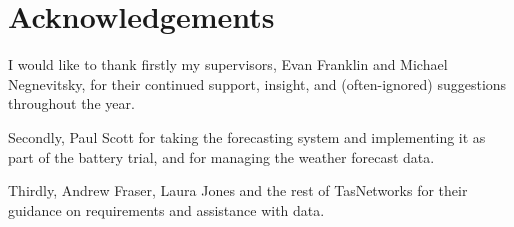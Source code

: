 \chapter{Acknowledgements}

I would like to thank firstly my supervisors, Evan Franklin and Michael Negnevitsky, for their continued support, insight, and (often-ignored) suggestions throughout the year.

Secondly, Paul Scott for taking the forecasting system and implementing it as part of the battery trial, and for managing the weather forecast data.

Thirdly, Andrew Fraser, Laura Jones and the rest of TasNetworks for their guidance on requirements and assistance with data.